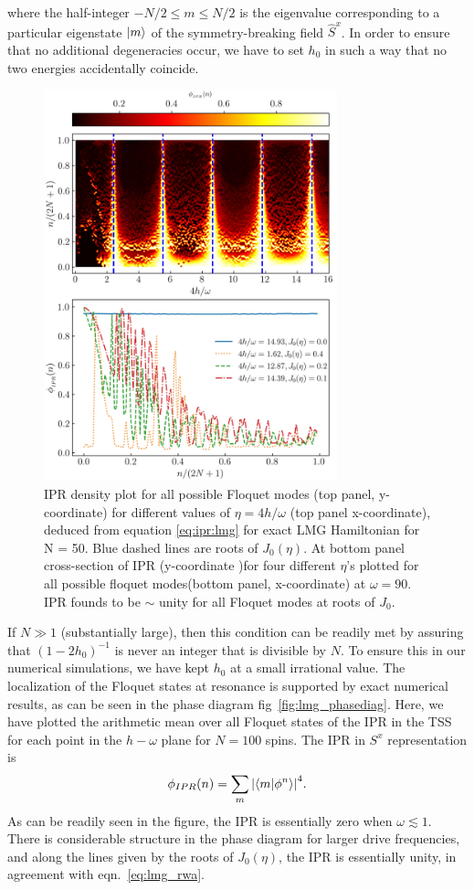 \documentclass[%
reprint,
superscriptaddress,
amsmath,amssymb,
aps,
prb,
showkeys,
]{revtex4-2}
\begin{document}
	where the half-integer $-N/2\leq m \leq N/2$ is the eigenvalue corresponding to a particular eigenstate $\ket{m}$ of the symmetry-breaking field $\hat{S}^x$. In order to ensure that no additional degeneracies occur, we have to set $h_0$ in  such a way that no two energies accidentally coincide.
	\begin{figure}[t!]
		\centering
		\includegraphics[width = 8.5cm]{ipr_exact_dynm_N50_frq_90_.jpeg}
		\caption{IPR density plot for all possible Floquet modes (top panel, y-coordinate) for different values of $\eta = 4h/\omega$ (top panel x-coordinate), deduced from equation \ref{eq:ipr:lmg} for exact LMG Hamiltonian for N = 50. Blue dashed lines are roots of $J_0(\eta)$. At bottom panel cross-section of IPR (y-coordinate )for four different $\eta$'s plotted for all possible floquet modes(bottom panel, x-coordinate) at $\omega=90$. IPR founds to be $\sim$ unity for all Floquet modes at roots of $J_0$.}
		\label{fig:lmg_ipr_exact}
	\end{figure}
	If $N\gg 1$ (substantially large), then this condition can be readily met by assuring that $(1-2h_0)^{-1}$ is never an integer that is divisible by $N$. To ensure this in our numerical simulations, we have kept $h_0$ at a small irrational value.
	The localization of the Floquet states at resonance is supported by exact numerical results, as can be seen in the phase diagram fig~\ref{fig:lmg_phasediag}. Here, we have plotted the arithmetic mean over all Floquet states of the IPR 
	in the TSS for each point in the $h-\omega$ plane for $N=100$ spins.  The IPR in $S^x$ representation is
	\begin{equation}
		\phi_{IPR}(n) = \sum_m \abs{\ip{m}{\phi^n}}^4.
		\label{eq:ipr:lmg}
	\end{equation}
	As can be readily seen in the figure, the IPR is essentially zero when  $\omega \lesssim 1$. There is considerable structure in the phase diagram for larger drive frequencies, and along the lines given by the roots of $J_0(\eta)$, the IPR is essentially unity, in agreement with eqn.~\ref{eq:lmg_rwa}.
	
\end{document}
